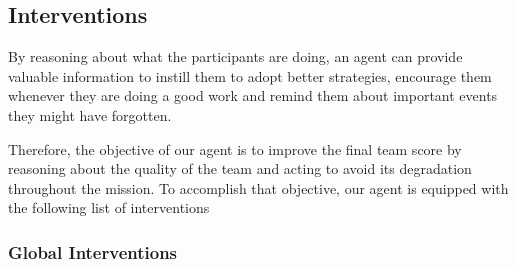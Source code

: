 \subsection{Interventions}

By reasoning about what the participants are doing, an agent can provide valuable information to instill them to adopt better strategies, encourage them whenever they are doing a good work and remind them about important events they might have forgotten. 
            
Therefore, the objective of our agent is to improve the final team score by reasoning about the quality of the team and acting to avoid its degradation throughout the mission. To accomplish that objective, our agent is equipped with the following list of interventions

\subsubsection{Global Interventions}

